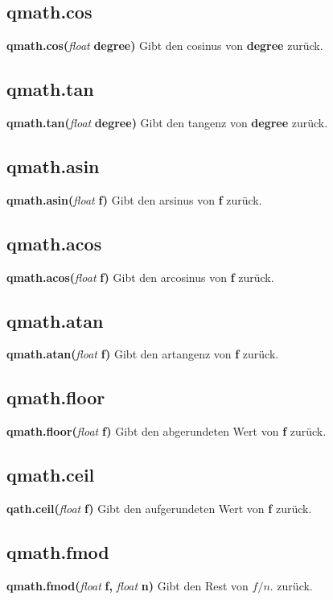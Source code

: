 \documentclass[11pt,a4paper]{book}
\begin{document}
\subsection{qmath.cos}
\label{qm-cos}
\textbf{qmath.cos(}\textit{float}\textbf{ degree)}
\newline
Gibt den cosinus von \textbf{degree} zurück.
\subsection{qmath.tan}
\label{qm-tan}
\textbf{qmath.tan(}\textit{float}\textbf{ degree)}
\newline
Gibt den tangenz von \textbf{degree} zurück. 
\subsection{qmath.asin}
\label{qm-asin}
\textbf{qmath.asin(}\textit{float}\textbf{ f)}
\newline
Gibt den arsinus von \textbf{f} zurück.
\subsection{qmath.acos}
\label{qm-acos}
\textbf{qmath.acos(}\textit{float}\textbf{ f)}
\newline
Gibt den arcosinus von \textbf{f} zurück.
\subsection{qmath.atan}
\label{qm-atan}
\textbf{qmath.atan(}\textit{float}\textbf{ f)}
\newline
Gibt den  artangenz von \textbf{f} zurück.
\subsection{qmath.floor}
\label{qm-floor}
\textbf{qmath.floor(}\textit{float}\textbf{ f)}
\newline
Gibt den abgerundeten Wert von \textbf{f} zurück.
\subsection{qmath.ceil}
\label{qm-ceil}
\textbf{qath.ceil(}\textit{float}\textbf{ f)}
\newline
Gibt den aufgerundeten Wert von \textbf{f} zurück.
\subsection{qmath.fmod}
\label{qm-fmod}
\textbf{qmath.fmod(}\textit{float}\textbf{ f, }\textit{float}\textbf{ n)}
\newline
Gibt den Rest von \begin{math}f/n.\end{math} zurück.
\end{document}
